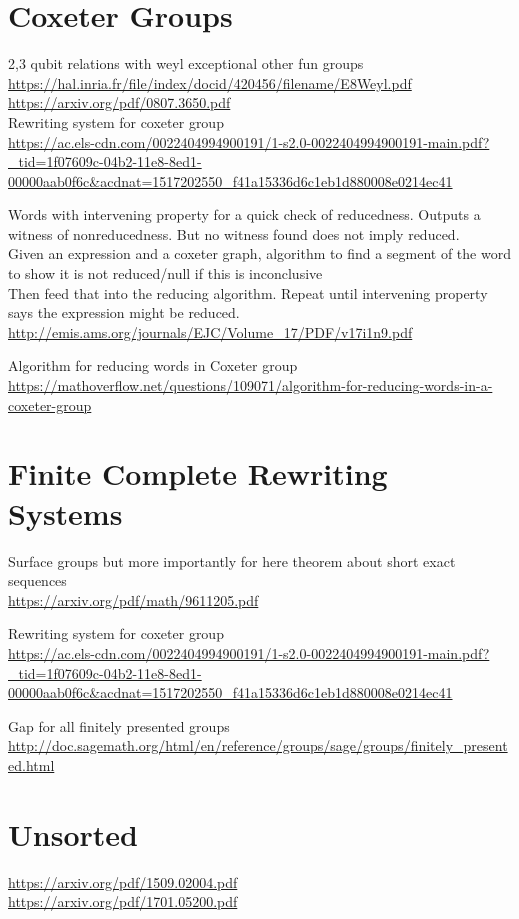 \documentclass[11pt]{article}
\theoremstyle{change}
\theoremstyle{nonumberplain}
\numberwithin{equation}{section}
\begin{document}
\section{Coxeter Groups}

2,3 qubit relations with weyl exceptional other fun groups\\
\url{https://hal.inria.fr/file/index/docid/420456/filename/E8Weyl.pdf}\\
\url{https://arxiv.org/pdf/0807.3650.pdf}\\

Rewriting system for coxeter group\\
\url{https://ac.els-cdn.com/0022404994900191/1-s2.0-0022404994900191-main.pdf?_tid=1f07609c-04b2-11e8-8ed1-00000aab0f6c&acdnat=1517202550_f41a15336d6c1eb1d880008e0214ec41}

Words with intervening property for a quick check of reducedness. Outputs a witness of nonreducedness. But no witness found does not imply reduced.\\
Given an expression and a coxeter graph, algorithm to find a segment of the word to show it is not reduced/null if this is inconclusive\\
Then feed that into the reducing algorithm. Repeat until intervening property says the expression might be reduced.\\
\url{http://emis.ams.org/journals/EJC/Volume_17/PDF/v17i1n9.pdf}

Algorithm for reducing words in Coxeter group\\
\url{https://mathoverflow.net/questions/109071/algorithm-for-reducing-words-in-a-coxeter-group}

\section{Finite Complete Rewriting Systems}

Surface groups but more importantly for here theorem about short exact sequences\\
\url{https://arxiv.org/pdf/math/9611205.pdf}

Rewriting system for coxeter group\\
\url{https://ac.els-cdn.com/0022404994900191/1-s2.0-0022404994900191-main.pdf?_tid=1f07609c-04b2-11e8-8ed1-00000aab0f6c&acdnat=1517202550_f41a15336d6c1eb1d880008e0214ec41}

Gap for all finitely presented groups\\
\url{http://doc.sagemath.org/html/en/reference/groups/sage/groups/finitely_presented.html}

\section{Unsorted}

\url{https://arxiv.org/pdf/1509.02004.pdf}\\
\url{https://arxiv.org/pdf/1701.05200.pdf}
\end{document}
